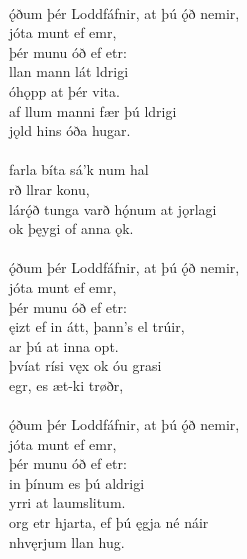  \\

\bva {}ǫ́ðum þér Loddfáfnir, \hld at þú ǫ́ð nemir, \\%
\ind {}jóta munt ef emr, \\%
\ind þér munu óð ef etr: \\%
llan mann \hld lát ldrigi \\%
\ind óhǫpp at þér vita. \\%
af llum manni \hld fær þú ldrigi \\%
\ind {}jǫld hins óða hugar.\\%

 \\

\bva {}farla bíta \hld sá'k num hal \\%
\ind {}rð llrar konu, \\%
lárǫ́ð tunga \hld varð hǫ́num at jǫrlagi \\%
\ind ok þęygi of anna ǫk.\\%

 \\

\bva {}ǫ́ðum þér Loddfáfnir, \hld at þú ǫ́ð nemir, \\%
\ind {}jóta munt ef emr, \\%
\ind þér munu óð ef etr: \\%
ęizt ef in átt, \hld þann's el trúir, \\%
\ind {}ar þú at inna opt. \\%
þvíat rísi vęx \hld ok óu grasi \\%
\ind {}egr, es æt-ki trøðr,\\%

 \\

\bva {}ǫ́ðum þér Loddfáfnir, \hld at þú ǫ́ð nemir, \\%
\ind {}jóta munt ef emr, \\%
\ind þér munu óð ef etr: \\%
in þínum \hld {}es þú aldrigi \\%
\ind {}yrri at laumslitum. \\%
org etr hjarta, \hld ef þú ęgja né náir \\%
\ind {}nhvęrjum llan hug.\\%

